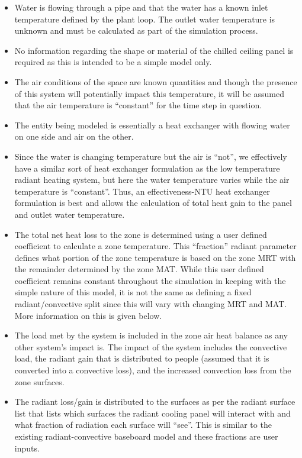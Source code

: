 \begin{itemize}
\tightlist
\item
  Water is flowing through a pipe and that the water has a known inlet temperature defined by the plant loop.  The outlet water temperature is unknown and must be calculated as part of the simulation process.
\item
  No information regarding the shape or material of the chilled ceiling panel is required as this is intended to be a simple model only.
\item
  The air conditions of the space are known quantities and though the presence of this system will potentially impact this temperature, it will be assumed that the air temperature is “constant” for the time step in question.
\item
  The entity being modeled is essentially a heat exchanger with flowing water on one side and air on the other.
\item
  Since the water is changing temperature but the air is “not”, we effectively have a similar sort of heat exchanger formulation as the low temperature radiant heating system, but here the water temperature varies while the air temperature is “constant”.  Thus, an effectiveness-NTU heat exchanger formulation is best and allows the calculation of total heat gain to the panel and outlet water temperature.
\item
  The total net heat loss to the zone is determined using a user defined coefficient to calculate a zone temperature.  This “fraction” radiant parameter defines what portion of the zone temperature is based on the zone MRT with the remainder determined by the zone MAT.  While this user defined coefficient remains constant throughout the simulation in keeping with the simple nature of this model, it is not the same as defining a fixed radiant/convective split since this will vary with changing MRT and MAT.  More information on this is given below.
\item
  The load met by the system is included in the zone air heat balance as any other system’s impact is.  The impact of the system includes the convective load, the radiant gain that is distributed to people (assumed that it is converted into a convective loss), and the increased convection loss from the zone surfaces.
\item
  The radiant loss/gain is distributed to the surfaces as per the radiant surface list that lists which surfaces the radiant cooling panel will interact with and what fraction of radiation each surface will “see”.  This is similar to the existing radiant-convective baseboard model and these fractions are user inputs.

\end{itemize}
